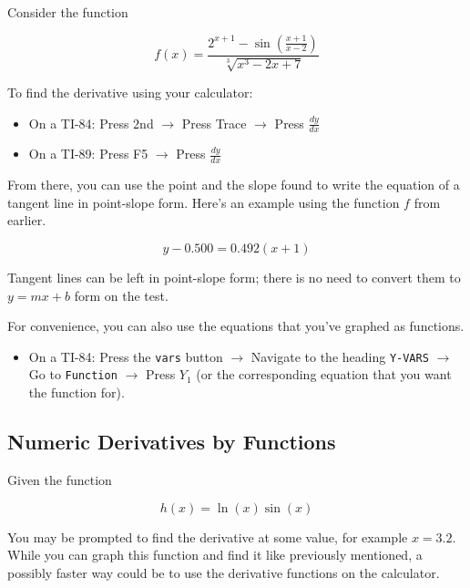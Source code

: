 Consider the function

\[ f \left( x \right) = \dfrac{2^{x + 1} - \sin{\left( \frac{x + 1}{x - 2} \right)}}{\sqrt[3]{x^3 - 2x + 7}} \]

To find the derivative using your calculator:

\begin{itemize}
    \item On a TI-84: Press \( 2 \)nd \( \to \) Press Trace \( \to \) Press \( \frac{dy}{dx} \)
    \item On a TI-89: Press F5 \( \to \) Press \( \frac{dy}{dx} \)
\end{itemize}

From there, you can use the point and the slope found to write the equation of a tangent line in point-slope form. Here's an example using the function \( f \) from earlier.

\[ y - 0.500 = 0.492 \left( x + 1 \right) \]

\begin{tip}
    Tangent lines can be left in point-slope form; there is no need to convert them to \( y = mx + b \) form on the test.
\end{tip}

For convenience, you can also use the equations that you've graphed as functions.

\begin{itemize}
    \item On a TI-84: Press the \verb+vars+ button \( \to \) Navigate to the heading \verb+Y-VARS+ \( \to \) Go to \verb+Function+ \( \to \) Press \( Y_1 \) (or the corresponding equation that you want the function for).
\end{itemize}

\subsection{Numeric Derivatives by Functions}

Given the function

\[ h \left( x \right) = \ln{\left( x \right)}\sin{\left( x \right)} \]

You may be prompted to find the derivative at some value, for example \( x = 3.2 \). While you can graph this function and find it like previously mentioned, a possibly faster way could be to use the derivative functions on the calculator.

